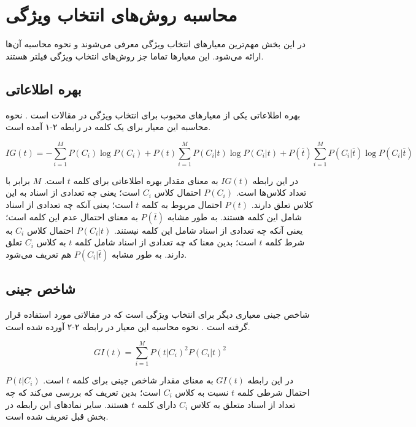 \section{محاسبه روش‌های انتخاب ویژگی}
در این بخش مهم‌ترین معیار‌های انتخاب ویژگی معرفی می‌شوند و نحوه محاسبه آن‌ها ارائه می‌شود. این معیار‌ها تماما جز روش‌های انتخاب ویژگی فیلتر هستند.

\subsection{بهره اطلاعاتی}
بهره اطلاعاتی
یکی از معیارهای محبوب برای انتخاب ویژگی در مقالات است
\cite{labani2018novel}\cite{uysal2016improved}\cite{ghareb2016hybrid}.
نحوه محاسبه این معیار برای یک کلمه در رابطه ۲-۱ آمده است.

\begin{equation}
IG(t) = -\sum_{i=1}^M P(C_i)\log{P(C_i)} + P(t)\sum_{i=1}^M P(C_i|t)\log{P(C_i|t)} + P(\bar{t})\sum_{i=1}^M P(C_i|\bar{t})\log{P(C_i|\bar{t})}
\end{equation}

در این رابطه
$IG(t)$
به معنای مقدار بهره اطلاعاتی برای کلمه
$t$
است. 
$M$
  برابر با تعداد کلاس‌ها است.
$P(C_i)$
احتمال کلاس
$C_i$
است؛ یعنی چه تعدادی از اسناد به این کلاس تعلق دارند.
$P(t)$
احتمال مربوط به کلمه
$t$
است؛ یعنی آنکه چه تعدادی از اسناد شامل این کلمه هستند. به طور مشابه 
$P(\bar{t})$
به معنای احتمال عدم این کلمه است؛ یعنی آنکه چه تعدادی از اسناد شامل این کلمه نیستند.
$P(C_i|t)$
احتمال کلاس
$C_i$
به شرط کلمه
$t$
است؛ بدین معنا که چه تعدادی از اسناد شامل کلمه
$t$
به کلاس
$C_i$
تعلق دارند.
به طور مشابه
$P(C_i|\bar{t})$
هم تعریف می‌شود.

\subsection{شاخص جینی}
 شاخص جینی
معیاری دیگر برای انتخاب ویژگی است که در مقالاتی مورد استفاده قرار گرفته است
\cite{labani2018novel}\cite{uysal2016improved}.
نحوه محاسبه این معیار در رابطه ۲-۲ آورده شده است.

\begin{equation}
GI(t) = \sum_{i=1}^M P(t|C_i)^2 P(C_i|t)^2
\end{equation}

در این رابطه 
$GI(t)$
به معنای مقدار شاخص جینی برای کلمه
$t$
است. 
$P(t|C_i)$
احتمال شرطی کلمه 
$t$
نسبت به کلاس
$C_i$
است؛ بدین تعریف که بررسی می‌کند که چه تعداد از اسناد متعلق به کلاس 
$C_i$
دارای کلمه
$t$
هستند. سایر نماد‌های این رابطه در بخش قبل تعریف شده است.

